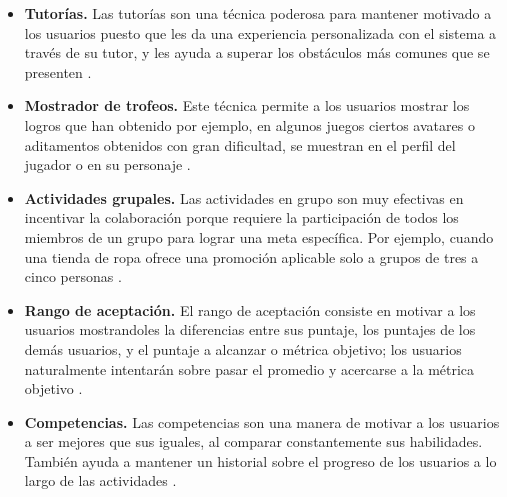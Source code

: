     \begin{itemize}

    \item
    {\bf Tutorías.}
        Las tutorías son una técnica poderosa para mantener motivado a los usuarios
        puesto que les da una experiencia personalizada con el sistema a través de su
        tutor, y les ayuda a superar los obstáculos más comunes que se presenten
        \cite[p. 215]{Octalysis}.

    \item
    {\bf Mostrador de trofeos.}
        Este técnica permite a los usuarios mostrar los logros que han obtenido
        por ejemplo, en algunos juegos ciertos avatares o aditamentos obtenidos con
        gran dificultad, se muestran en el perfil del jugador o en su personaje
        \cite[p. 218]{Octalysis}.

    \item
    {\bf Actividades grupales.}
        Las actividades en grupo son muy efectivas en incentivar la colaboración
        porque requiere la participación de todos los miembros de un grupo para
        lograr una meta específica. Por ejemplo, cuando una tienda de ropa ofrece
        una promoción aplicable solo a grupos de tres a cinco personas
        \cite[p. 221]{Octalysis}.

    \item
    {\bf Rango de aceptación.} %
        El rango de aceptación consiste en motivar a los usuarios mostrandoles
        la diferencias entre sus puntaje, los puntajes de los demás usuarios,
        y el puntaje a alcanzar o métrica objetivo; los usuarios naturalmente
        intentarán sobre pasar el promedio y acercarse a la métrica objetivo
        \cite[p. 226]{Octalysis}.

    \item
    {\bf Competencias.}
        Las competencias son una manera de motivar a los usuarios a ser mejores
        que sus iguales, al comparar constantemente sus habilidades. También ayuda
        a mantener un historial sobre el progreso de los usuarios a lo largo de las
        actividades \cite[p. 210]{Octalysis}.


    \end{itemize}

